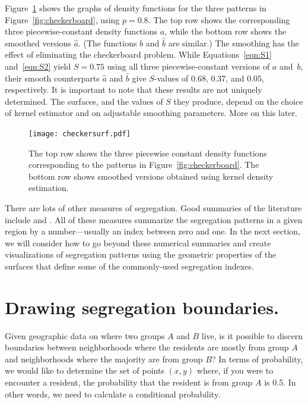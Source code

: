 \documentclass{article}
\theoremstyle{theorem}
\theoremstyle{definition}
\begin{document}
Figure~\ref{fig:kdeexamples} shows the graphs of density functions for the three patterns in Figure~\ref{fig:checkerboard}, using $p = 0.8$. The top row shows the corresponding three piecewise-constant density functions $a$, while the bottom row shows the smoothed versions $\hat{a}$. (The functions $b$ and $\hat{b}$ are similar.) The smoothing has the effect of eliminating the checkerboard problem. While Equations~\ref{eqn:S1} and~\ref{eqn:S2} yield $S = 0.75$ using all three piecewise-constant versions of $a$ and~$b$, their smooth counterparts $\hat{a}$ and $\hat{b}$ give $S$-values of 0.68, 0.37, and 0.05, respectively.
It is important to note that these results are not uniquely determined. The surfaces, and the values of $S$ they produce, depend on the choice of kernel estimator and on adjustable smoothing parameters. More on this later.

\begin{figure}
  \texttt{[image: checkersurf.pdf]} %
  \caption{The top row shows the three piecewise constant density functions corresponding to the patterns in Figure~\ref{fig:checkerboard}. The bottom row shows smoothed versions obtained using kernel density estimation.}
  \label{fig:kdeexamples}
\end{figure}

There are lots of other measures of segregation. Good summaries of the literature include \cite{reardonosullivan04} and \cite{harrisjohnson18}. All of these measures summarize the segregation patterns in a given region by a number---usually an index between zero and one. In the next section, we will consider how to go beyond these numerical summaries and create visualizations of segregation patterns using the geometric properties of the surfaces that define some of the commonly-used segregation indexes.

\section{Drawing segregation boundaries.}

Given geographic data on where two groups $A$ and $B$ live, is it possible to discern boundaries between neighborhoods where the residents are mostly from group $A$ and neighborhoods where the majority are from group $B$? In terms of probability, we would like to determine the set of points $(x,y)$ where, if you were to encounter a resident, the probability that the resident is from group $A$ is 0.5. In other words, we need to calculate a conditional probability.
\end{document}
